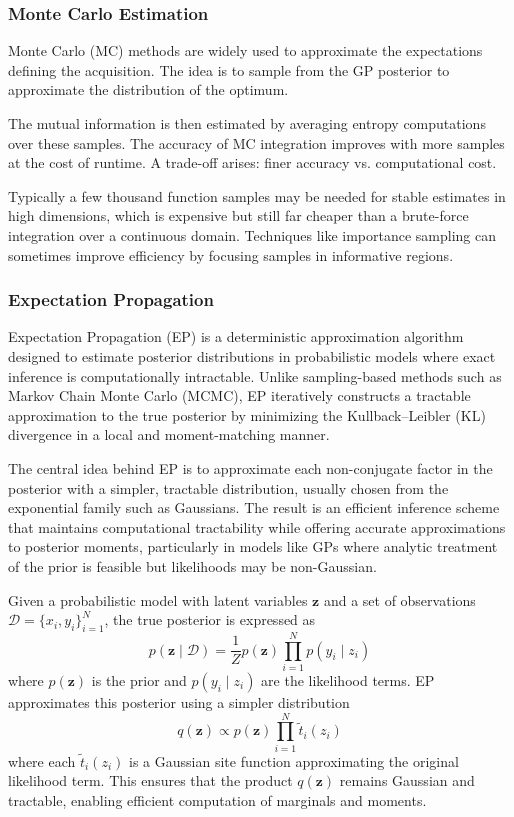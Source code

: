 \documentclass{ut-thesis}
\begin{document}
\subsubsection{Monte Carlo Estimation}

Monte Carlo (MC) methods are widely used to approximate the expectations defining the acquisition. The idea is to sample from the GP posterior to approximate the distribution of the optimum\cite{robert2004monte}. 

The mutual information is then estimated by averaging entropy computations over these samples. The accuracy of MC integration improves with more samples at the cost of runtime. A trade-off arises: finer accuracy vs. computational cost. 

Typically a few thousand function samples may be needed for stable estimates in high dimensions, which is expensive but still far cheaper than a brute-force integration over a continuous domain. Techniques like importance sampling can sometimes improve efficiency by focusing samples in informative regions.

\subsubsection{Expectation Propagation}

Expectation Propagation (EP) is a deterministic approximation algorithm designed to estimate posterior distributions in probabilistic models where exact inference is computationally intractable\cite{minka2001expectation}. Unlike sampling-based methods such as Markov Chain Monte Carlo (MCMC), EP iteratively constructs a tractable approximation to the true posterior by minimizing the Kullback–Leibler (KL) divergence in a local and moment-matching manner. 

The central idea behind EP is to approximate each non-conjugate factor in the posterior with a simpler, tractable distribution, usually chosen from the exponential family such as Gaussians. The result is an efficient inference scheme that maintains computational tractability while offering accurate approximations to posterior moments, particularly in models like GPs where analytic treatment of the prior is feasible but likelihoods may be non-Gaussian.

Given a probabilistic model with latent variables $\mathbf{z}$ and a set of observations $\mathcal{D} = \{x_i, y_i\}_{i=1}^N$, the true posterior is expressed as
\begin{equation}
    p(\mathbf{z} \mid \mathcal{D}) = \frac{1}{Z} p(\mathbf{z}) \prod_{i=1}^N p(y_i \mid z_i)
\end{equation}
where $p(\mathbf{z})$ is the prior and $p(y_i \mid z_i)$ are the likelihood terms. EP approximates this posterior using a simpler distribution
\begin{equation}
    q(\mathbf{z}) \propto p(\mathbf{z}) \prod_{i=1}^N \tilde{t}_i(z_i)
\end{equation}
where each $\tilde{t}_i(z_i)$ is a Gaussian site function approximating the original likelihood term. This ensures that the product $q(\mathbf{z})$ remains Gaussian and tractable, enabling efficient computation of marginals and moments.
\end{document}
